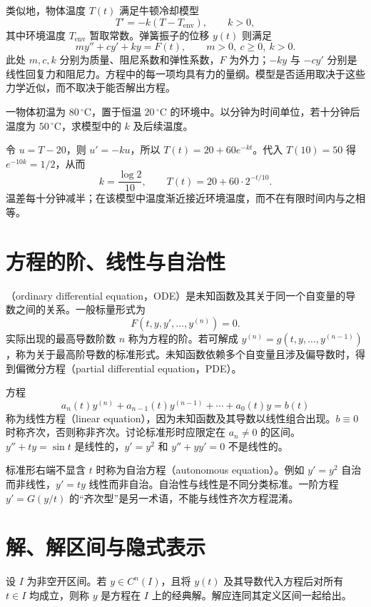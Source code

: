 \documentclass[UTF8,12pt,a4paper,fontset=fandol]{ctexbook}
\begin{document}
类似地，物体温度 $T(t)$ 满足牛顿冷却模型
\[
 T'=-k(T-T_{\mathrm{env}}),\qquad k>0,
\]
其中环境温度 $T_{\mathrm{env}}$ 暂取常数。弹簧振子的位移 $y(t)$ 则满足
\[
 my''+cy'+ky=F(t),\qquad m>0,\ c\geq0,\ k>0.
\]
此处 $m,c,k$ 分别为质量、阻尼系数和弹性系数，$F$ 为外力；$-ky$ 与 $-cy'$ 分别是线性回复力和阻尼力。方程中的每一项均具有力的量纲。模型是否适用取决于这些力学近似，而不取决于能否解出方程。

\begin{example}[冷却模型]
一物体初温为 $80\,{}^\circ\mathrm C$，置于恒温 $20\,{}^\circ\mathrm C$ 的环境中。以分钟为时间单位，若十分钟后温度为 $50\,{}^\circ\mathrm C$，求模型中的 $k$ 及后续温度。
\end{example}
\begin{solve}
令 $u=T-20$，则 $u'=-ku$，所以 $T(t)=20+60e^{-kt}$。代入 $T(10)=50$ 得 $e^{-10k}=1/2$，从而
\[
 k=\frac{\log2}{10},\qquad T(t)=20+60\cdot2^{-t/10}.
\]
温差每十分钟减半；在该模型中温度渐近接近环境温度，而不在有限时间内与之相等。
\end{solve}

\section{方程的阶、线性与自治性}
\begin{definition}
（ordinary differential equation，ODE）是未知函数及其关于同一个自变量的导数之间的关系。一般标量形式为
\[
 F(t,y,y',\ldots,y^{(n)})=0.
\]
实际出现的最高导数阶数 $n$ 称为方程的阶。若可解成 $y^{(n)}=g(t,y,\ldots,y^{(n-1)})$，称为关于最高阶导数的标准形式。未知函数依赖多个自变量且涉及偏导数时，得到偏微分方程（partial differential equation，PDE）。
\end{definition}

方程
\begin{equation}
 a_n(t)y^{(n)}+a_{n-1}(t)y^{(n-1)}+\cdots+a_0(t)y=b(t)
 \label{eq:ode-general-linear}
\end{equation}
称为线性方程（linear equation），因为未知函数及其导数以线性组合出现。$b\equiv0$ 时称齐次，否则称非齐次。讨论标准形时应限定在 $a_n\ne0$ 的区间。$y''+ty=\sin t$ 是线性的，$y'=y^2$ 和 $y''+yy'=0$ 不是线性的。

标准形右端不显含 $t$ 时称为自治方程（autonomous equation）。例如 $y'=y^2$ 自治而非线性，$y'=ty$ 线性而非自治。自治性与线性是不同分类标准。一阶方程 $y'=G(y/t)$ 的“齐次型”是另一术语，不能与线性齐次方程混淆。

\section{解、解区间与隐式表示}
\begin{definition}
设 $I$ 为非空开区间。若 $y\in C^n(I)$，且将 $y(t)$ 及其导数代入方程后对所有 $t\in I$ 均成立，则称 $y$ 是方程在 $I$ 上的经典解。解应连同其定义区间一起给出。
\end{definition}
\end{document}
